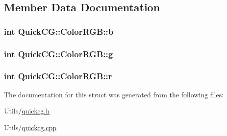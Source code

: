 \subsection{Member Data Documentation}
\hypertarget{structQuickCG_1_1ColorRGB_ae85c3461b4eaed0bf2ccdf07f4bbedb4}{
\subsubsection[{b}]{\setlength{\rightskip}{0pt plus 5cm}int Quick\-C\-G\-::\-Color\-R\-G\-B\-::b}}\label{structQuickCG_1_1ColorRGB_ae85c3461b4eaed0bf2ccdf07f4bbedb4}
\hypertarget{structQuickCG_1_1ColorRGB_af9d258f0404f8dc39677ccc6a474e36a}{
\subsubsection[{g}]{\setlength{\rightskip}{0pt plus 5cm}int Quick\-C\-G\-::\-Color\-R\-G\-B\-::g}}\label{structQuickCG_1_1ColorRGB_af9d258f0404f8dc39677ccc6a474e36a}
\hypertarget{structQuickCG_1_1ColorRGB_a3873210b09a441c02ec224cfc49b8385}{
\subsubsection[{r}]{\setlength{\rightskip}{0pt plus 5cm}int Quick\-C\-G\-::\-Color\-R\-G\-B\-::r}}\label{structQuickCG_1_1ColorRGB_a3873210b09a441c02ec224cfc49b8385}


The documentation for this struct was generated from the following files\-:\begin{DoxyCompactItemize}
\item 
Utils/\hyperlink{quickcg_8h}{quickcg.\-h}\item 
Utils/\hyperlink{quickcg_8cpp}{quickcg.\-cpp}\end{DoxyCompactItemize}
